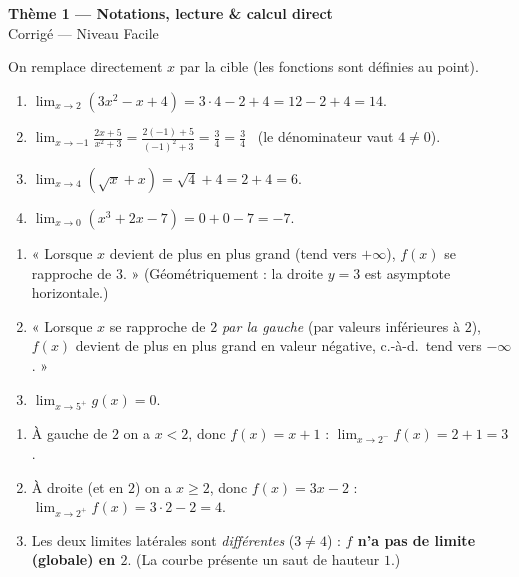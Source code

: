\documentclass[11pt,a4paper]{article}
\begin{document}
\begin{center}
{\Large\bfseries\color{primarydark}Thème 1 — Notations, lecture \& calcul direct}\\[2pt]
{\large\color{excol}Corrigé — Niveau Facile}
\end{center}
\vspace{6pt}

\begin{correction}
On remplace directement $x$ par la cible (les fonctions sont définies au point).
\begin{enumerate}[label=\alph*),leftmargin=2em,itemsep=3pt]
  \item $\displaystyle\lim_{x\to 2}(3x^2-x+4)=3\cdot 4-2+4=12-2+4=\boxed{14}$.
  \item $\displaystyle\lim_{x\to -1}\frac{2x+5}{x^2+3}=\frac{2(-1)+5}{(-1)^2+3}=\frac{3}{4}=\boxed{\tfrac34}$
        \ (le dénominateur vaut $4\neq 0$).
  \item $\displaystyle\lim_{x\to 4}(\sqrt{x}+x)=\sqrt{4}+4=2+4=\boxed{6}$.
  \item $\displaystyle\lim_{x\to 0}(x^3+2x-7)=0+0-7=\boxed{-7}$.
\end{enumerate}
\end{correction}

\begin{correction}
\begin{enumerate}[label=\alph*),leftmargin=2em,itemsep=3pt]
  \item « Lorsque $x$ devient de plus en plus grand (tend vers $+\infty$), $f(x)$ se rapproche de $3$. »
        (Géométriquement : la droite $y=3$ est asymptote horizontale.)
  \item « Lorsque $x$ se rapproche de $2$ \emph{par la gauche} (par valeurs inférieures à $2$), $f(x)$
        devient de plus en plus grand en valeur négative, c.-à-d.\ tend vers $-\infty$. »
  \item $\displaystyle\lim_{x\to 5^{+}} g(x)=0$.
\end{enumerate}
\end{correction}

\begin{correction}
\begin{enumerate}[label=\alph*),leftmargin=2em,itemsep=3pt]
  \item À gauche de $2$ on a $x<2$, donc $f(x)=x+1$ : $\displaystyle\lim_{x\to 2^{-}}f(x)=2+1=3$.
  \item À droite (et en $2$) on a $x\geq 2$, donc $f(x)=3x-2$ : $\displaystyle\lim_{x\to 2^{+}}f(x)=3\cdot 2-2=4$.
  \item Les deux limites latérales sont \emph{différentes} ($3\neq 4$) : \textbf{$f$ n'a pas de limite
        (globale) en $2$}. (La courbe présente un saut de hauteur $1$.)
\end{enumerate}
\end{correction}
\end{document}

